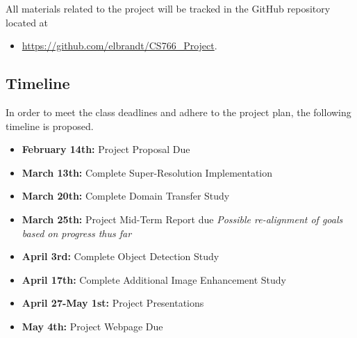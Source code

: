 \documentclass{article}
\begin{document}
\noindent All materials related to the project will be tracked in the GitHub repository located at 

\begin{itemize}
    \item \url{https://github.com/elbrandt/CS766_Project}.
\end{itemize}


\subsection{Timeline}
In order to meet the class deadlines and adhere to the project plan, the following timeline is proposed.

\begin{itemize}
    \item \textbf{February 14th:} Project Proposal Due 
    \item \textbf{March 13th:} Complete Super-Resolution Implementation
    \item \textbf{March 20th:} Complete Domain Transfer Study
    \item \textbf{March 25th:} Project Mid-Term Report due \textit{Possible re-alignment of goals based on progress thus far}
    \item \textbf{April 3rd:} Complete Object Detection Study
    \item \textbf{April 17th:} Complete Additional Image Enhancement Study
    \item \textbf{April 27-May 1st:} Project Presentations
    \item \textbf{May 4th:} Project Webpage Due
\end{itemize}


\printbibliography
\end{document}
